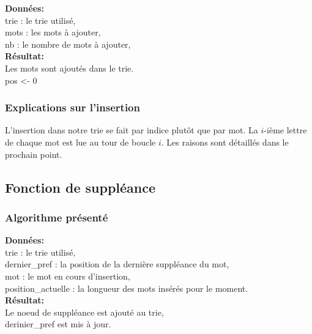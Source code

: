 \begin{algorithm}[H]
    \textbf{Données:}\\
    trie : le trie utilisé,\\
    mots : les mots à ajouter,\\
    nb : le nombre de mots à ajouter,\\
    \textbf{Résultat:}\\
    Les mots sont ajoutés dans le trie.\\
    pos <- 0\;
\end{algorithm}

\subsubsection*{Explications sur l'insertion}
L'insertion dans notre trie se fait par indice plutôt que par mot. La $i$-ième
lettre de chaque mot est lue au tour de boucle $i$. Les raisons
sont détaillés dans le prochain point.

\subsection{Fonction de suppléance}
\subsubsection*{Algorithme présenté}
\begin{algorithm}[H]
    \textbf{Données:}\\
    trie : le trie utilisé,\\
    dernier\_pref : la position de la dernière suppléance du mot,\\
    mot : le mot en cours d'insertion,\\
    position\_actuelle : la longueur des mots insérés pour le moment.\\
    \textbf{Résultat:}\\
    Le noeud de suppléance est ajouté au trie,\\
    derinier\_pref est mis à jour.\\
\end{algorithm}

